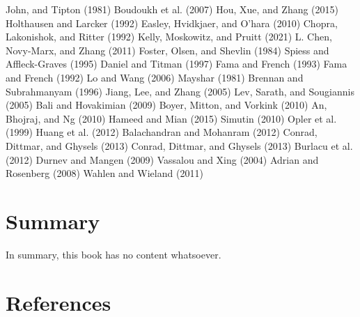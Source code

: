 \documentclass[
  letterpaper,
  DIV=11,
  numbers=noendperiod]{scrreprt}
\begin{document}
John, and Tipton (1981) Boudoukh et al. (2007) Hou, Xue, and Zhang
(2015) Holthausen and Larcker (1992) Easley, Hvidkjaer, and O'hara
(2010) Chopra, Lakonishok, and Ritter (1992) Kelly, Moskowitz, and
Pruitt (2021) L. Chen, Novy-Marx, and Zhang (2011) Foster, Olsen, and
Shevlin (1984) Spiess and Affleck-Graves (1995) Daniel and Titman (1997)
Fama and French (1993) Fama and French (1992) Lo and Wang (2006) Mayshar
(1981) Brennan and Subrahmanyam (1996) Jiang, Lee, and Zhang (2005) Lev,
Sarath, and Sougiannis (2005) Bali and Hovakimian (2009) Boyer, Mitton,
and Vorkink (2010) An, Bhojraj, and Ng (2010) Hameed and Mian (2015)
Simutin (2010) Opler et al. (1999) Huang et al. (2012) Balachandran and
Mohanram (2012) Conrad, Dittmar, and Ghysels (2013) Conrad, Dittmar, and
Ghysels (2013) Burlacu et al. (2012) Durnev and Mangen (2009) Vassalou
and Xing (2004) Adrian and Rosenberg (2008) Wahlen and Wieland (2011)


\hypertarget{summary}{%
\chapter{Summary}\label{summary}}

In summary, this book has no content whatsoever.


\hypertarget{references}{%
\chapter*{References}\label{references}}

\end{document}
